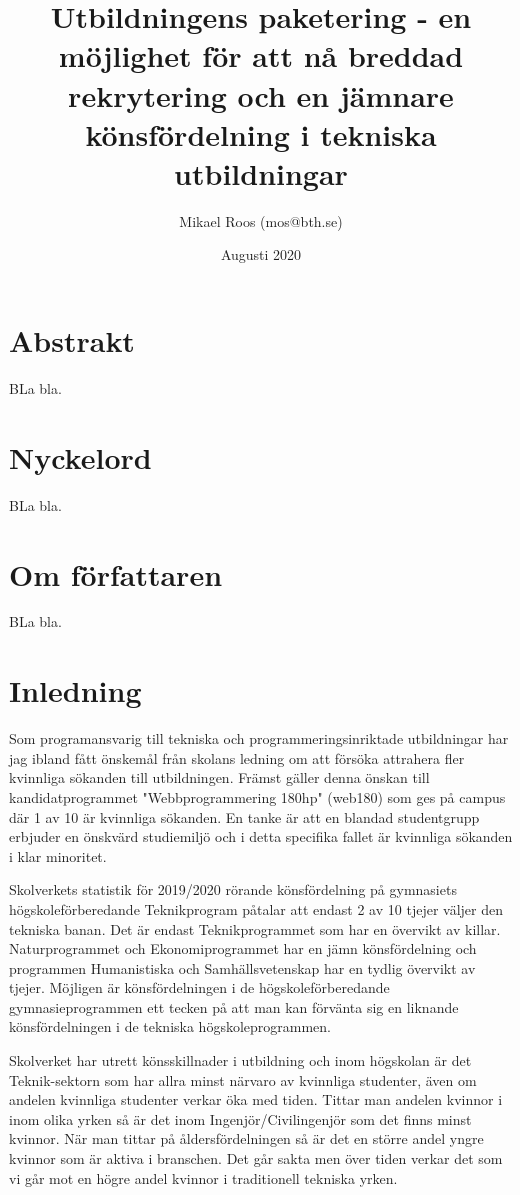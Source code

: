 \documentclass{article}
\title{Utbildningens paketering - en möjlighet för att nå breddad rekrytering och en jämnare könsfördelning i tekniska utbildningar}
\author{Mikael Roos (mos@bth.se)}
\date{Augusti 2020}
\begin{document}
\maketitle

\section*{Abstrakt}

BLa bla.


\section*{Nyckelord}

BLa bla.


\section*{Om författaren}

BLa bla.


\section*{Inledning}

Som programansvarig till tekniska och programmeringsinriktade utbildningar har jag ibland fått önskemål från skolans ledning om att försöka attrahera fler kvinnliga sökanden till utbildningen. Främst gäller denna önskan till kandidatprogrammet "Webbprogrammering 180hp" (web180) som ges på campus där 1 av 10 är kvinnliga sökanden. En tanke är att en blandad studentgrupp erbjuder en önskvärd studiemiljö och i detta specifika fallet är kvinnliga sökanden i klar minoritet.

Skolverkets statistik för 2019/2020 \cite{skolverket_2020} rörande könsfördelning på gymnasiets högskoleförberedande Teknikprogram påtalar att endast 2 av 10 tjejer väljer den tekniska banan. Det är endast Teknikprogrammet som har en övervikt av killar. Naturprogrammet och Ekonomiprogrammet har en jämn könsfördelning och programmen Humanistiska och Samhällsvetenskap har en tydlig övervikt av tjejer. Möjligen är könsfördelningen i de högskoleförberedande gymnasieprogrammen ett tecken på att man kan förvänta sig en liknande könsfördelningen i de tekniska högskoleprogrammen.

Skolverket har utrett könsskillnader i utbildning och inom högskolan är det Teknik-sektorn som har allra minst närvaro av kvinnliga studenter, även om andelen kvinnliga studenter verkar öka med tiden. Tittar man andelen kvinnor i inom olika yrken så är det inom Ingenjör/Civilingenjör som det finns minst kvinnor. När man tittar på åldersfördelningen så är det en större andel yngre kvinnor som är aktiva i branschen. Det går sakta men över tiden verkar det som vi går mot en högre andel kvinnor i traditionell tekniska yrken. \cite{skolverket_287}
\end{document}
